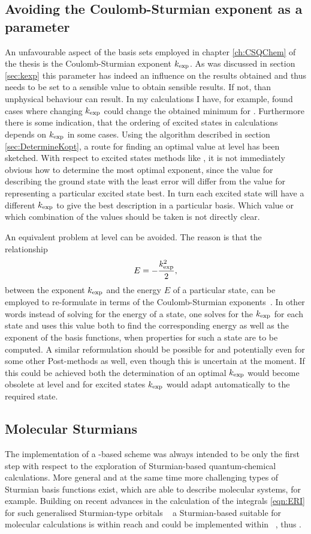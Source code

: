 \subsection{Avoiding the Coulomb-Sturmian exponent as a parameter}
An unfavourable aspect of the \CS basis sets
employed in chapter \ref{ch:CSQChem} of the thesis is
the Coulomb-Sturmian exponent $k_\text{exp}$.
As was discussed in section \ref{sec:kexp}
this parameter has indeed an influence on the results obtained
and thus needs to be set to a sensible value to obtain sensible results.
If not, than unphysical behaviour can result.
In my calculations I have, for example, found cases
where changing $k_\text{exp}$ could change the obtained \SCF minimum
for \HF.
Furthermore there is some indication,
that the ordering of excited states in \ADC calculations
depends on $k_\text{exp}$ in some cases.
Using the algorithm described in section \ref{sec:DetermineKopt},
a route for finding an optimal value at \HF level has been sketched.
With respect to excited states methods like \ADC,
it is not immediately obvious how to determine the most optimal exponent,
since the value for describing the ground state with the least error
will differ from the value for representing a particular excited state best.
In turn each excited state will have a different $k_\text{exp}$
to give the best description in a particular \CS basis.
Which value or which combination of the values should be taken
is not directly clear.

\noindent
An equivalent problem at \FCI level can be avoided.
The reason is that the relationship
\[ E = - \frac{k_\text{exp}^2}{2}, \]
between the \CS exponent $k_\text{exp}$ and the energy $E$ of a particular state,
can be employed to re-formulate \FCI in terms of the
Coulomb-Sturmian exponents~\cite{Avery2006}.
In other words instead of solving for the energy of a state,
one solves for the $k_\text{exp}$ for each state
and uses this value both to find the corresponding energy
as well as the exponent of the basis functions,
when properties for such a state are to be computed.
A similar reformulation should be possible for \HF
and potentially even for some other Post-\HF methods as well,
even though this is uncertain at the moment.
If this could be achieved both the determination of an optimal
$k_\text{exp}$ would become obsolete at \HF level
and for excited states $k_\text{exp}$ would adapt automatically to the required state.

\subsection{Molecular Sturmians}
The implementation of a \CS-based \SCF scheme was always intended
to be only the first step with respect to the exploration
of Sturmian-based quantum-chemical calculations.
More general and at the same time more challenging types of Sturmian basis
functions exist,
which are able to describe molecular systems, for example.
Building on recent advances in the calculation of the \ERI integrals
\eqref{eqn:ERI} for such generalised Sturmian-type orbitals%
~\cite{Avery2006,Avery2011PhD,Avery2011,Morales2016,Avery2017,Randazzo2015,Granados2016}
a Sturmian-based \HF suitable for molecular calculations is within reach
and could be implemented within \sturmint~\cite{sturmintWeb}, thus \molsturm.

